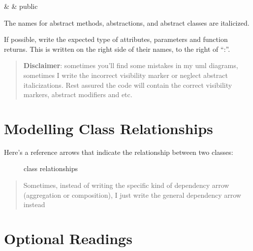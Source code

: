 \begin{longtable}[]
&
& public \\
\end{longtable}

The names for abstract methods, abstractions, and abstract classes are
italicized.

If possible, write the expected type of attributes, parameters and
function returns. This is written on the right side of their names, to
the right of ``:''.

\begin{quote}
\textbf{Disclaimer}: sometimes you'll find some mistakes in my uml
diagrams, sometimes I write the incorrect visibility marker or neglect
abstract italicizations. Rest assured the code will contain the correct
visibility markers, abstract modifiers and etc.
\end{quote}

\section{Modelling Class
Relationships}\label{unified-modelling-language-for-class-diagrams.md__modelling-class-relationships}

Here's a reference arrows that indicate the relationship between two
classes:

\begin{figure}
\centering
\pandocbounded{}
\caption{class relationships}
\end{figure}

\begin{quote}
Sometimes, instead of writing the specific kind of dependency arrow
(aggregation or composition), I just write the general dependency arrow
instead
\end{quote}

\section{Optional
Readings}\label{unified-modelling-language-for-class-diagrams.md__optional-readings}

